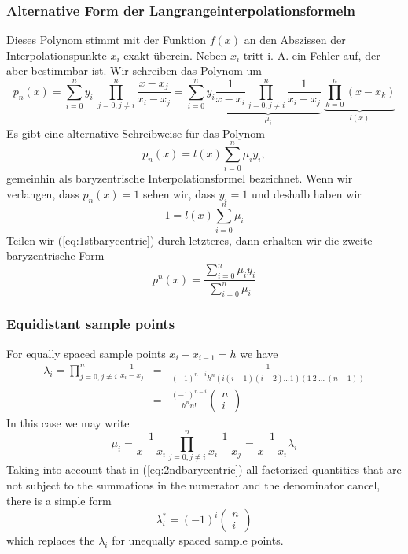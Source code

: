 \subsubsection{Alternative Form  der Langrangeinterpolationsformeln}
Dieses Polynom stimmt mit der Funktion $f(x)$ an den Abszissen der Interpolationspunkte $x_i$ exakt überein. Neben $x_i$ tritt i. A. ein Fehler auf, der aber bestimmbar ist. Wir schreiben das Polynom um
\[ p_n(x)=\sum_{i=0}^n y_i\ \prod_{j=0,j\neq i}^n\frac{x-x_j}{x_i-x_j}=
\sum_{i=0}^n y_i 
\underbrace{
\frac{1}{x-x_i} \prod_{j=0,j\neq i}^n\frac{1}{x_i-x_j} 
}_{\mu_i}\ 
\underbrace{\prod_{k=0}^n (x-x_k)}_{l(x)}
\]
Es gibt eine alternative Schreibweise für das Polynom
\begin{equation}\label{eq:1stbarycentric}
	p_n(x) = l(x)\sum_{i=0}^n \mu_iy_i,
\end{equation}
gemeinhin als baryzentrische Interpolationsformel bezeichnet. Wenn wir verlangen, dass $p_n(x)=1$ sehen wir, dass $y_i=1$ und deshalb haben wir
\[ 1 = l(x)\sum_{i=0}^n \mu_i \]
Teilen wir (\ref{eq:1stbarycentric}) durch letzteres, dann erhalten wir die zweite baryzentrische Form
\begin{equation}
	p^n(x)=\frac{\sum_{i=0}^n \mu_iy_i}{\sum_{i=0}^n \mu_i}
	\label{eq:2ndbarycentric}
\end{equation}
\subsubsection{Equidistant sample points}
For equally spaced sample points $x_i-x_{i-1}=h$ we have
\begin{eqnarray*}
\lambda_i =\prod_{j=0,j\neq i}^n\frac{1}{x_i-x_j} 
&=&\frac{1}{(-1)^{n-i}h^n(i(i-1)(i-2)\ldots1)(1\ 2\ \ldots\ (n-1))}\\[1ex]
&=&\frac{(-1)^{n-i}}{h^n n!}
\left(\begin{array}{c}n\\ i\end{array}\right)
\end{eqnarray*}
In this case we may write 
\[
\mu_i=\frac{1}{x-x_i} \prod_{j=0,j\neq i}^n\frac{1}{x_i-x_j}=
\frac{1}{x-x_i} \lambda_i
\]
Taking into account that in (\ref{eq:2ndbarycentric}) all factorized quantities
that are not subject to the summations in the numerator and the denominator
cancel, there is a simple form 
\[ 
\lambda_i^* = (-1)^i\left(\begin{array}{c}n\\ i\end{array}\right)
\]
which replaces the $\lambda_i$ for unequally spaced sample points.
